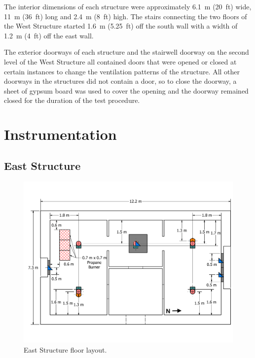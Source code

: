 \documentclass[12pt,oneside]{book}
\begin{document}
The interior dimensions of each structure were approximately 6.1~m (20~ft) wide, 11~m (36~ft) long and 2.4~m (8~ft) high. The stairs connecting the two floors of the West Structure started 1.6~m (5.25~ft) off the south wall with a width of 1.2~m (4~ft) off the east wall.

The exterior doorways of each structure and the stairwell doorway on the second level of the West Structure all contained doors that were opened or closed at certain instances to change the ventilation patterns of the structure. All other doorways in the structures did not contain a door, so to close the doorway, a sheet of gypsum board was used to cover the opening and the doorway remained closed for the duration of the test procedure.
\FloatBarrier

\section{Instrumentation}
\label{sec:Instrumentation}

\subsection{East Structure}
\label{sec:East_instrument}

\begin{figure}[!ht]
	\includegraphics[width=\columnwidth]{../Figures/Floor_Plans/East_Structure_Dimensioned_Instrumentation}
	\caption[Dimensioned floor plan of the East Structure.]{East Structure floor layout.}
	\label{fig:east_instrumentation}
\end{figure}
\end{document}
